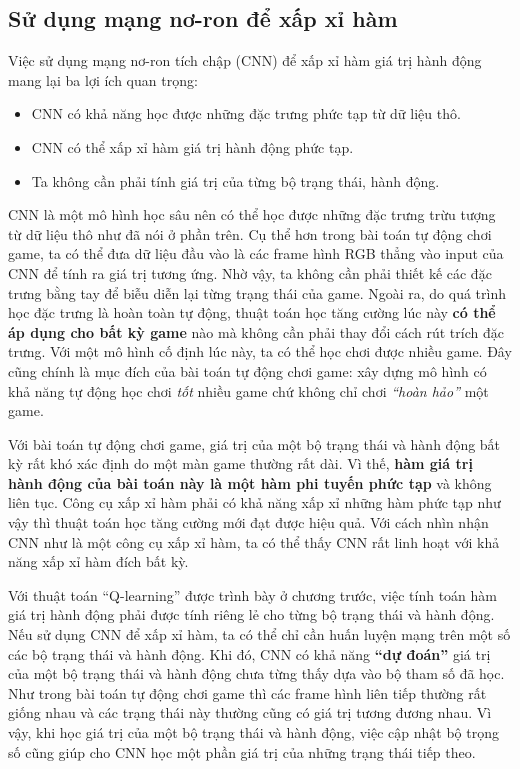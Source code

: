 \subsection{Sử dụng mạng nơ-ron để xấp xỉ hàm}
	Việc sử dụng mạng nơ-ron tích chập (CNN) để xấp xỉ hàm giá trị hành động mang lại ba lợi ích quan trọng:
	\begin{itemize}
		\item CNN có khả năng học được những đặc trưng phức tạp từ dữ liệu thô.
		\item CNN có thể xấp xỉ hàm giá trị hành động phức tạp.
		\item Ta không cần phải tính giá trị của từng bộ trạng thái, hành động.
	\end{itemize}
	
	CNN là một mô hình học sâu nên có thể học được những đặc trưng trừu tượng từ dữ liệu thô như đã nói ở phần trên.
	Cụ thể hơn trong bài toán tự động chơi game, ta có thể đưa dữ liệu đầu vào là các frame hình RGB thẳng vào input của CNN để tính ra giá trị tương ứng.
	Nhờ vậy, ta không cần phải thiết kế các đặc trưng bằng tay để biễu diễn lại từng trạng thái của game.
	Ngoài ra, do quá trình học đặc trưng là hoàn toàn tự động, thuật toán học tăng cường lúc này \textbf{có thể áp dụng cho bất kỳ game} nào mà không cần phải thay đổi cách rút trích đặc trưng.
	Với một mô hình cố định lúc này, ta có thể học chơi được nhiều game.
	Đây cũng chính là mục đích của bài toán tự động chơi game: xây dựng mô hình có khả năng tự động học chơi \textit{tốt} nhiều game chứ không chỉ chơi \textit{``hoàn hảo''} một game.
	
	Với bài toán tự động chơi game, giá trị của một bộ trạng thái và hành động bất kỳ rất khó xác định do một màn game thường rất dài.
	Vì thế, \textbf{hàm giá trị hành động của bài toán này là một hàm phi tuyến phức tạp} và không liên tục.
	Công cụ xấp xỉ hàm phải có khả năng xấp xỉ những hàm phức tạp như vậy thì thuật toán học tăng cường mới đạt được hiệu quả.
	Với cách nhìn nhận CNN như là một công cụ xấp xỉ hàm, ta có thể thấy CNN rất linh hoạt với khả năng xấp xỉ hàm đích bất kỳ.
	
	Với thuật toán ``Q-learning'' được trình bày ở chương trước, việc tính toán hàm giá trị hành động phải được tính riêng lẻ cho từng bộ trạng thái và hành động. 
	Nếu sử dụng CNN để xấp xỉ hàm, ta có thể chỉ cần huấn luyện mạng trên một số các bộ trạng thái và hành động.
	Khi đó, CNN có khả năng \textbf{``dự đoán''} giá trị của một bộ trạng thái và hành động chưa từng thấy dựa vào bộ tham số đã học.
	Như trong bài toán tự động chơi game thì các frame hình liên tiếp thường rất giống nhau và các trạng thái này thường cũng có giá trị tương đương nhau.
	Vì vậy, khi học giá trị của một bộ trạng thái và hành động, việc cập nhật bộ trọng số cũng giúp cho CNN học một phần giá trị của những trạng thái tiếp theo.
	
